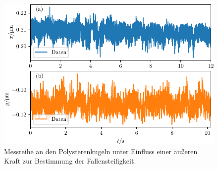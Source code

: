 \begin{figure}
  \centering
  \includegraphics[scale = 1]{../analysis/data/ii_polysteren/70mA/results/with_force_70mA.pdf}
  \caption{Messreihe an den Polysterenkugeln unter Einfluss einer äußeren Kraft zur Bestimmung der Fallensteifigkeit.}
  \label{fig: poly_with_force}
\end{figure}




